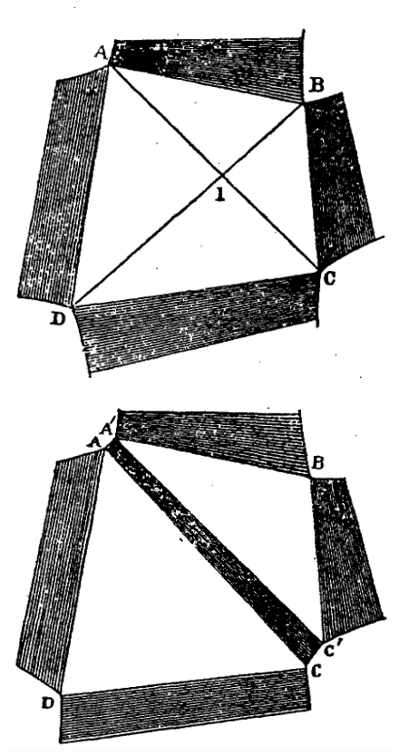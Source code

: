 \documentclass[12pt]{memoir}
\begin{document}
\begin{figure}[h]
\centering
\begin{minipage}{.3\textwidth}
  \centering
  \includegraphics[width=\linewidth]{fig_4}
  \label{fig_4}
\end{minipage}%
\begin{minipage}{.3\textwidth}
  \centering
  \includegraphics[width=\linewidth]{fig_5}
  \label{fig_5}
\end{minipage}
\end{figure}
\end{document}
